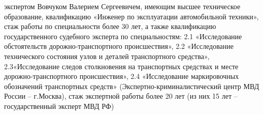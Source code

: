 экспертом Вовчуком Валерием Сергеевичем, имеющим высшее техническое образование, квалификацию «Инженер по эксплуатации автомобильной техники», стаж работы по специальности более 30 лет, а также квалификацию государственного судебного эксперта по специальностям: 2.1 «Исследование обстоятельств дорожно-транспортного происшествия», 2.2 «Исследование технического состояния узлов и деталей транспортного средства», 2.3«Исследование следов столкновения на транспортных средствах и месте дорожно-транспортного происшествия», 2.4 «Исследование маркировочных обозначений транспортных средств»  (Экспертно-криминалистический центр МВД России – г.Москва), стаж экспертной работы более 20 лет (из них 15 лет – государственный эксперт МВД РФ)
